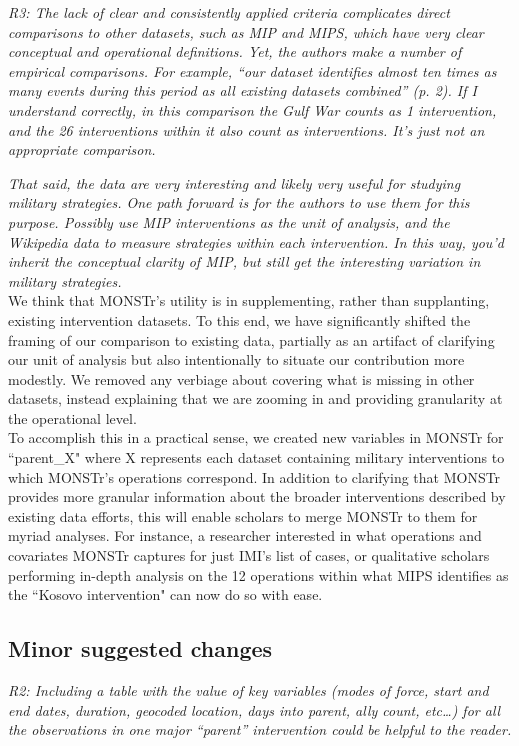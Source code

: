 \documentclass[fleqn,12pt]{article}
\begin{document}
\noindent
\textit{R3: The lack of clear and consistently applied criteria complicates direct comparisons to other datasets, such as MIP and MIPS, which have very clear conceptual and operational definitions. Yet, the authors make a number of empirical comparisons. For example, “our dataset identifies almost ten times as many events during this period as all existing datasets combined” (p. 2). If I understand correctly, in this comparison the Gulf War counts as 1 intervention, and the 26 interventions within it also count as interventions. It’s just not an appropriate comparison.}

\textit{That said, the data are very interesting and likely very useful for studying military strategies. One path forward is for the authors to use them for this purpose. Possibly use MIP interventions as the unit of analysis, and the Wikipedia data to measure strategies within each intervention. In this way, you’d inherit the conceptual clarity of MIP, but still get the interesting variation in military strategies.} \\

We think that MONSTr's utility is in supplementing, rather than supplanting, existing intervention datasets. To this end, we have significantly shifted the framing of our comparison to existing data, partially as an artifact of clarifying our unit of analysis but also intentionally to situate our contribution more modestly. We removed any verbiage about covering what is missing in other datasets, instead explaining that we are zooming in and providing granularity at the operational level. \\

To accomplish this in a practical sense, we created new variables in MONSTr for ``parent\_X" where X represents each dataset containing military interventions to which MONSTr's operations correspond. In addition to clarifying that MONSTr provides more granular information about the broader interventions described by existing data efforts, this will enable scholars to merge MONSTr to them for myriad analyses. For instance, a researcher interested in what operations and covariates MONSTr captures for just IMI's list of cases, or qualitative scholars performing in-depth analysis on the 12 operations within what MIPS identifies as the ``Kosovo intervention" can now do so with ease.

\subsection*{Minor suggested changes}
\textit{R2: Including a table with the value of key variables (modes of force, start and end dates, duration, geocoded location, days into parent, ally count, etc…) for all the observations in one major “parent” intervention could be helpful to the reader.} \\
\end{document}
